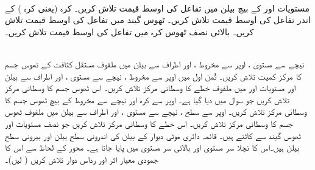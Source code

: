 \\

مستویات  اور  کے بیچ بیلن   میں تفاعل  کی اوسط قیمت    تلاش کریں۔
کرہ  (یعنی کرہ )  کے اندر  تفاعل  کی اوسط قیمت تلاش کریں۔
ٹھوس گیند   میں تفاعل  کی اوسط قیمت تلاش کریں۔
بالائی نصف ٹھوس کرہ   میں تفاعل  کی اوسط قیمت تلاش کریں۔

\\
نیچے سے مستوی ، اوپر سے مخروط ، اور اطراف سے بیلن  میں ملفوف  مستقل کثافت کے ٹھوس جسم کا  مرکز کمیت تلاش کریں۔
ثُمن اول میں اوپر سے مخروط ، نیچے سے مستوی ، اور اطراف سے بیلن  اور مستویات  اور  میں ملفوف  خطے کا وسطانی مرکز تلاش کریں۔
اس ٹھوس جسم کا وسطانی مرکز تلاش کریں جو سوال  میں دیا گیا ہے۔ 
اوپر سے کرہ  اور نیچے سے  مخروط  کے بیچ ٹھوس جسم کا وسطانی مرکز تلاش کریں۔
اوپر سے سطح ، نیچے سے مستوی ، اور اطراف سے  بیلن  میں ملفوف ٹھوس جسم کا وسطانی مرکز تلاش کریں۔
اس خطے کا وسطانی مرکز تلاش کریں جو نصف مستویات  اور  ٹھوس گیند   سے  کاٹتے ہیں۔
قائمہ دائری موٹی دیوار کے  بیلن   کی اندرونی سطح بیلن  اور بیرونی سطح بیلن  ہیں۔اس کا نچلا سر مستوی  اور بالائی سر  مستوی   میں پایا جاتا ہے۔ محور  کے لحاظ سے  اس  کا جمودی معیار اثر اور رداس دوار تلاش کریں ( لیں)۔

